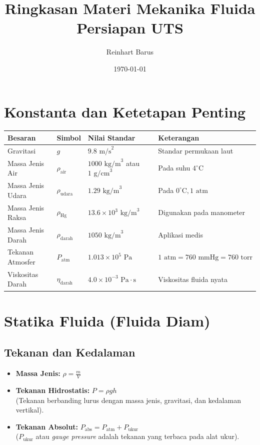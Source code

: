 \documentclass{article}
\title{\textbf{Ringkasan Materi Mekanika Fluida} \\ \large Persiapan UTS}
\author{Reinhart Barus}
\date{\today}
\begin{document}
\maketitle

\section{Konstanta dan Ketetapan Penting}
\begin{table}[h]
\centering
\begin{tabular}{@{}llll@{}}
\toprule
\textbf{Besaran} & \textbf{Simbol} & \textbf{Nilai Standar} & \textbf{Keterangan} \\ \midrule
Gravitasi & $g$ & $9.8 \text{ m/s}^2$ & Standar permukaan laut \\
Massa Jenis Air & $\rho_{\text{air}}$ & $1000 \text{ kg/m}^3$ atau $1 \text{ g/cm}^3$ & Pada suhu $4^\circ\text{C}$ \\
Massa Jenis Udara & $\rho_{\text{udara}}$ & $1.29 \text{ kg/m}^3$ & Pada $0^\circ\text{C}, 1 \text{ atm}$ \\
Massa Jenis Raksa & $\rho_{\text{Hg}}$ & $13.6 \times 10^3 \text{ kg/m}^3$ & Digunakan pada manometer \\
Massa Jenis Darah & $\rho_{\text{darah}}$ & $1050 \text{ kg/m}^3$ & Aplikasi medis \\
Tekanan Atmosfer & $P_{\text{atm}}$ & $1.013 \times 10^5 \text{ Pa}$ & $1 \text{ atm} = 760 \text{ mmHg} = 760 \text{ torr}$ \\
Viskositas Darah & $\eta_{\text{darah}}$ & $4.0 \times 10^{-3} \text{ Pa}\cdot\text{s}$ & Viskositas fluida nyata \\
\bottomrule
\end{tabular}
\end{table}

\section{Statika Fluida (Fluida Diam)}

\subsection{Tekanan dan Kedalaman}
\begin{itemize}
    \item \textbf{Massa Jenis:} $\rho = \frac{m}{V}$
    \item \textbf{Tekanan Hidrostatis:} $P = \rho g h$ \\
    (Tekanan berbanding lurus dengan massa jenis, gravitasi, dan kedalaman vertikal).
    \item \textbf{Tekanan Absolut:} $P_{\text{abs}} = P_{\text{atm}} + P_{\text{ukur}}$ \\
    ($P_{\text{ukur}}$ atau \textit{gauge pressure} adalah tekanan yang terbaca pada alat ukur).
\end{itemize}
\end{document}

